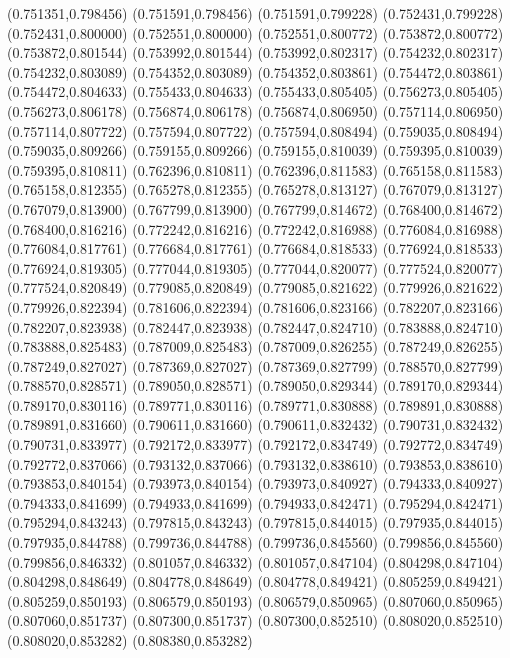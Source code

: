 (0.751351,0.798456)
(0.751591,0.798456)
(0.751591,0.799228)
(0.752431,0.799228)
(0.752431,0.800000)
(0.752551,0.800000)
(0.752551,0.800772)
(0.753872,0.800772)
(0.753872,0.801544)
(0.753992,0.801544)
(0.753992,0.802317)
(0.754232,0.802317)
(0.754232,0.803089)
(0.754352,0.803089)
(0.754352,0.803861)
(0.754472,0.803861)
(0.754472,0.804633)
(0.755433,0.804633)
(0.755433,0.805405)
(0.756273,0.805405)
(0.756273,0.806178)
(0.756874,0.806178)
(0.756874,0.806950)
(0.757114,0.806950)
(0.757114,0.807722)
(0.757594,0.807722)
(0.757594,0.808494)
(0.759035,0.808494)
(0.759035,0.809266)
(0.759155,0.809266)
(0.759155,0.810039)
(0.759395,0.810039)
(0.759395,0.810811)
(0.762396,0.810811)
(0.762396,0.811583)
(0.765158,0.811583)
(0.765158,0.812355)
(0.765278,0.812355)
(0.765278,0.813127)
(0.767079,0.813127)
(0.767079,0.813900)
(0.767799,0.813900)
(0.767799,0.814672)
(0.768400,0.814672)
(0.768400,0.816216)
(0.772242,0.816216)
(0.772242,0.816988)
(0.776084,0.816988)
(0.776084,0.817761)
(0.776684,0.817761)
(0.776684,0.818533)
(0.776924,0.818533)
(0.776924,0.819305)
(0.777044,0.819305)
(0.777044,0.820077)
(0.777524,0.820077)
(0.777524,0.820849)
(0.779085,0.820849)
(0.779085,0.821622)
(0.779926,0.821622)
(0.779926,0.822394)
(0.781606,0.822394)
(0.781606,0.823166)
(0.782207,0.823166)
(0.782207,0.823938)
(0.782447,0.823938)
(0.782447,0.824710)
(0.783888,0.824710)
(0.783888,0.825483)
(0.787009,0.825483)
(0.787009,0.826255)
(0.787249,0.826255)
(0.787249,0.827027)
(0.787369,0.827027)
(0.787369,0.827799)
(0.788570,0.827799)
(0.788570,0.828571)
(0.789050,0.828571)
(0.789050,0.829344)
(0.789170,0.829344)
(0.789170,0.830116)
(0.789771,0.830116)
(0.789771,0.830888)
(0.789891,0.830888)
(0.789891,0.831660)
(0.790611,0.831660)
(0.790611,0.832432)
(0.790731,0.832432)
(0.790731,0.833977)
(0.792172,0.833977)
(0.792172,0.834749)
(0.792772,0.834749)
(0.792772,0.837066)
(0.793132,0.837066)
(0.793132,0.838610)
(0.793853,0.838610)
(0.793853,0.840154)
(0.793973,0.840154)
(0.793973,0.840927)
(0.794333,0.840927)
(0.794333,0.841699)
(0.794933,0.841699)
(0.794933,0.842471)
(0.795294,0.842471)
(0.795294,0.843243)
(0.797815,0.843243)
(0.797815,0.844015)
(0.797935,0.844015)
(0.797935,0.844788)
(0.799736,0.844788)
(0.799736,0.845560)
(0.799856,0.845560)
(0.799856,0.846332)
(0.801057,0.846332)
(0.801057,0.847104)
(0.804298,0.847104)
(0.804298,0.848649)
(0.804778,0.848649)
(0.804778,0.849421)
(0.805259,0.849421)
(0.805259,0.850193)
(0.806579,0.850193)
(0.806579,0.850965)
(0.807060,0.850965)
(0.807060,0.851737)
(0.807300,0.851737)
(0.807300,0.852510)
(0.808020,0.852510)
(0.808020,0.853282)
(0.808380,0.853282)

